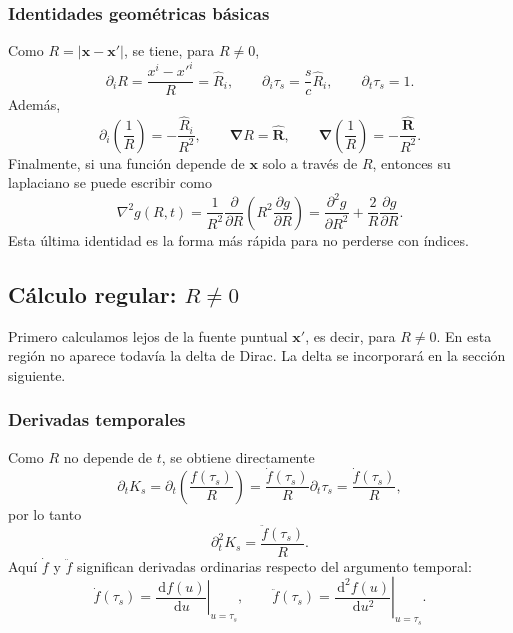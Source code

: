 \documentclass{article}
\numberwithin{equation}{section}
\newcommand{\dd}{\,\mathrm{d}}
\newcommand{\grad}{\bm{\nabla}}
\newcommand{\x}{\bm{x}}
\newcommand{\xp}{\bm{x}'}
\newcommand{\R}{R}
\newcommand{\hR}{\hat{\bm{R}}}
\begin{document}
\subsubsection{Identidades geométricas básicas}

Como \(\R=|\x-\xp|\), se tiene, para \(\R\neq 0\),
\begin{equation}
    \partial_i \R
    =\frac{x^i-x'^i}{\R}
    =\hat R_i,
    \qquad
    \partial_i \tau_s
    =\frac{s}{c}\hat R_i,
    \qquad
    \partial_t\tau_s=1.
    \label{eq:basic_derivatives}
\end{equation}
Además,
\begin{equation}
    \partial_i\left(\frac{1}{\R}\right)
    =-\frac{\hat R_i}{\R^2},
    \qquad
    \grad \R=\hR,
    \qquad
    \grad\left(\frac{1}{\R}\right)=-\frac{\hR}{\R^2}.
    \label{eq:grad_1R}
\end{equation}
Finalmente, si una función depende de \(\x\) solo a través de \(\R\), entonces su laplaciano se puede escribir como
\begin{equation}
    \nabla^2 g(\R,t)
    =\frac{1}{\R^2}\frac{\partial}{\partial \R}
    \left(\R^2\frac{\partial g}{\partial \R}\right)
    =\frac{\partial^2 g}{\partial \R^2}+\frac{2}{\R}\frac{\partial g}{\partial \R}.
    \label{eq:radial_laplacian}
\end{equation}
Esta última identidad es la forma más rápida para no perderse con índices.

\subsection{Cálculo regular: \texorpdfstring{\(\R\neq 0\)}{R distinto de cero}}

Primero calculamos lejos de la fuente puntual \(\xp\), es decir, para \(\R\neq 0\). En esta región no aparece todavía la delta de Dirac. La delta se incorporará en la sección siguiente.

\subsubsection{Derivadas temporales}

Como \(\R\) no depende de \(t\), se obtiene directamente
\begin{equation}
    \partial_t K_s
    =\partial_t\left(\frac{f(\tau_s)}{\R}\right)
    =\frac{\dot f(\tau_s)}{\R}\partial_t\tau_s
    =\frac{\dot f(\tau_s)}{\R},
    \label{eq:time_first}
\end{equation}
por lo tanto
\begin{equation}
    \partial_t^2K_s
    =\frac{\ddot f(\tau_s)}{\R}.
    \label{eq:time_second}
\end{equation}
Aquí \(\dot f\) y \(\ddot f\) significan derivadas ordinarias respecto del argumento temporal:
\begin{equation}
    \dot f(\tau_s)=\left.\frac{\dd f(u)}{\dd u}\right|_{u=\tau_s},
    \qquad
    \ddot f(\tau_s)=\left.\frac{\dd^2 f(u)}{\dd u^2}\right|_{u=\tau_s}.
    \label{eq:dots}
\end{equation}
\end{document}
